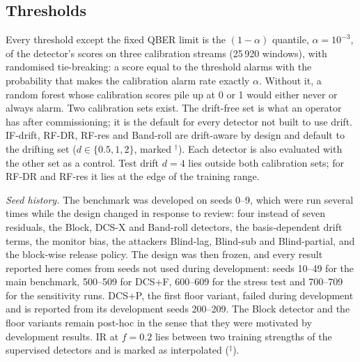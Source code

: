 \begin{itemize}
\end{itemize}

\subsection{Thresholds}
Every threshold except the fixed QBER limit is the $(1-\alpha)$ quantile, $\alpha=10^{-3}$, of the detector's scores on three calibration streams (25\,920 windows), with randomised tie-breaking: a score equal to the threshold alarms with the probability that makes the calibration alarm rate exactly $\alpha$. Without it, a random forest whose calibration scores pile up at 0 or 1 would either never or always alarm. Two calibration sets exist. The drift-free set is what an operator has after commissioning; it is the default for every detector not built to use drift. IF-drift, RF-DR, RF-res and Band-roll are drift-aware by design and default to the drifting set ($d\in\{0.5,1,2\}$, marked $^\dagger$). Each detector is also evaluated with the other set as a control. Test drift $d=4$ lies outside both calibration sets; for RF-DR and RF-res it lies at the edge of the training range.

\emph{Seed history.} The benchmark was developed on seeds 0--9, which were run several times while the design changed in response to review: four instead of seven residuals, the Block, DCS-X and Band-roll detectors, the basis-dependent drift terms, the monitor bias, the attackers Blind-lag, Blind-sub and Blind-partial, and the block-wise release policy. The design was then frozen, and every result reported here comes from seeds not used during development: seeds 10--49 for the main benchmark, 500--509 for DCS+F, 600--609 for the stress test and 700--709 for the sensitivity runs. DCS+P, the first floor variant, failed during development and is reported from its development seeds 200--209. The Block detector and the floor variants remain post-hoc in the sense that they were motivated by development results. IR at $f=0.2$ lies between two training strengths of the supervised detectors and is marked as interpolated ($^\ddagger$).

